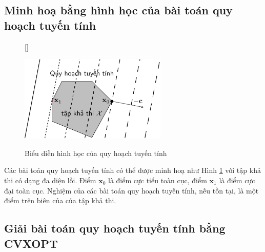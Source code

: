 \subsection{Minh hoạ bằng hình học của bài toán quy hoạch tuyến tính}

\begin{figure}[t]
[\FBwidth]
{\caption{Biểu diễn hình học của quy hoạch tuyến tính}
\label{fig:17_lp}}
{\includegraphics[width=7cm]{Chapters/08_ConvexOptimization/17_convexopt/latex/lp.pdf}}
\end{figure}

Các bài toán quy hoạch tuyến tính có thể được minh hoạ như Hình \ref{fig:17_lp} với tập khả thi có dạng đa diện lồi. Điểm
$\mathbf{x}_0$ là điểm cực tiểu toàn cục, điểm
$\mathbf{x}_1$ là điểm cực đại toàn cục. Nghiệm
của các bài toán quy hoạch tuyến tính, nếu tồn tại, là một điểm trên biên của của tập khả thi.



\subsection{Giải bài toán quy hoạch tuyến tính bằng CVXOPT}

